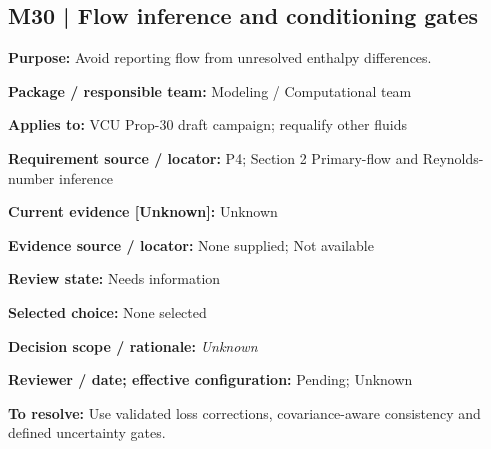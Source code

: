 \documentclass[11pt]{article}
\begin{document}
\par\noindent\begin{minipage}{\textwidth}\small\setlength{\parskip}{2pt}
\subsection*{M30 | Flow inference and conditioning gates}
\textbf{Purpose:} Avoid reporting flow from unresolved enthalpy differences.\par
\textbf{Package / responsible team:} Modeling / Computational team\par
\textbf{Applies to:} VCU Prop-30 draft campaign; requalify other fluids\par
\textbf{Requirement source / locator:} P4; Section 2 Primary-flow and Reynolds-number inference\par
\textbf{Current evidence [Unknown]:} Unknown\par
\textbf{Evidence source / locator:} None supplied; Not available\par
\textbf{Review state:} Needs information\par
\textbf{Selected choice:} None selected\par
\textbf{Decision scope / rationale:} \textit{Unknown}\par
\textbf{Reviewer / date; effective configuration:} Pending; Unknown\par
\textbf{To resolve:} Use validated loss corrections, covariance-aware consistency and defined uncertainty gates.\par
\end{minipage}\par\vspace{5pt}
\end{document}
